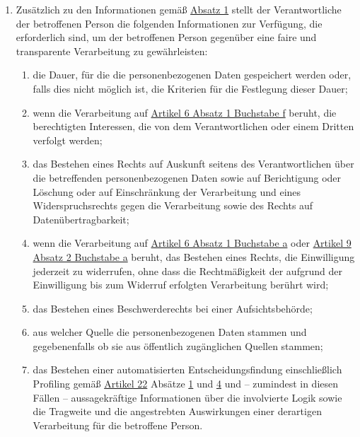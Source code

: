 \begin{enumerate}
  \item Zusätzlich zu den Informationen gemäß \hyperref[itm:14-1]{Absatz 1} stellt der Verantwortliche der betroffenen
   Person die folgenden Informationen zur Verfügung, die erforderlich sind, um der betroffenen Person gegenüber eine
   faire und transparente Verarbeitung zu gewährleisten:
  \label{itm:14-2}

  \begin{enumerate}
  
    \item die Dauer, für die die personenbezogenen Daten gespeichert werden oder, falls dies nicht möglich ist, die
     Kriterien für die Festlegung dieser Dauer;
    \label{itm:14-2a}

    \item wenn die Verarbeitung auf \hyperref[itm:06-1f]{Artikel 6 Absatz 1 Buchstabe f} beruht, die berechtigten
     Interessen, die von dem Verantwortlichen oder einem Dritten verfolgt werden;
    \label{itm:14-2b}

    \item das Bestehen eines Rechts auf Auskunft seitens des Verantwortlichen über die betreffenden personenbezogenen
     Daten sowie auf Berichtigung oder Löschung oder auf Einschränkung der Verarbeitung und eines Widerspruchsrechts
     gegen die Verarbeitung sowie des Rechts auf Datenübertragbarkeit;
    \label{itm:14-2c}

    \item wenn die Verarbeitung auf \hyperref[itm:06-1a]{Artikel 6 Absatz 1 Buchstabe a} oder \hyperref[itm:09-2a]
     {Artikel 9 Absatz 2 Buchstabe a} beruht, das Bestehen eines Rechts, die Einwilligung jederzeit zu widerrufen, ohne
     dass die Rechtmäßigkeit der aufgrund der Einwilligung bis zum Widerruf erfolgten Verarbeitung berührt wird;
    \label{itm:14-2d}

    \item das Bestehen eines Beschwerderechts bei einer Aufsichtsbehörde;
    \label{itm:14-2e}

    \item aus welcher Quelle die personenbezogenen Daten stammen und gegebenenfalls ob sie aus öffentlich zugänglichen
     Quellen stammen;
    \label{itm:14-2f}

    \item das Bestehen einer automatisierten Entscheidungsfindung einschließlich Profiling gemäß \hyperref[ch:22]
     {Artikel 22} Absätze \hyperref[itm:22-1]{1} und \hyperref[itm:22-4]{4} und -- zumindest in diesen Fällen --
     aussagekräftige Informationen über die involvierte Logik sowie die Tragweite und die angestrebten Auswirkungen
     einer derartigen Verarbeitung für die betroffene Person.
    \label{itm:14-2g}


\end{enumerate}
\end{enumerate}
